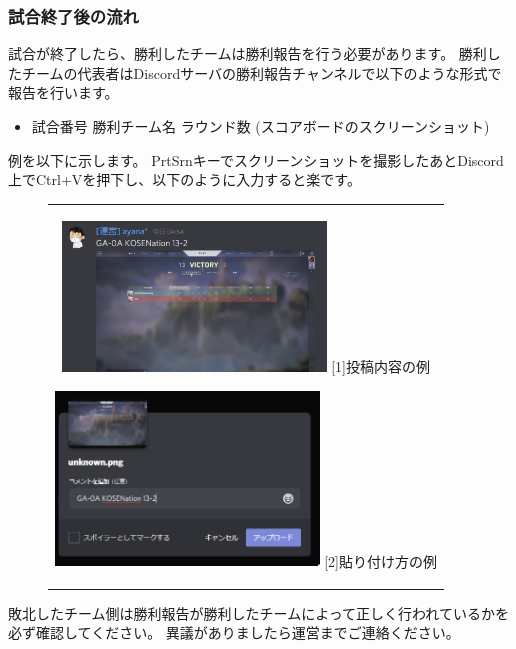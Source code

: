 \documentclass[uplatex,dvipdfmx]{jsarticle}
\begin{document}
	    \subsubsection{試合終了後の流れ}
	        試合が終了したら、勝利したチームは勝利報告を行う必要があります。
	        勝利したチームの代表者はDiscordサーバの勝利報告チャンネルで以下のような形式で報告を行います。
	        \begin{itemize}
	            \item 試合番号 勝利チーム名 ラウンド数 (スコアボードのスクリーンショット)
	        \end{itemize}
	        例を以下に示します。
	        PrtSrnキーでスクリーンショットを撮影したあとDiscord上でCtrl+Vを押下し、以下のように入力すると楽です。
	        \begin{figure}[H]
	            \begin{center}
	                \begin{tabular}{c}
	                    \begin{minipage}{0.5\hsize}
	                        \begin{center}
                                \includegraphics[width=70mm]{result.png}
	                            \hspace{1.6cm} [1]投稿内容の例
	                        \end{center}
	                    \end{minipage}

	                    \begin{minipage}{0.5\hsize}
	                        \begin{center}
                                \includegraphics[width=70mm]{example.png}
	                            \hspace{1.6cm} [2]貼り付け方の例
	                        \end{center}
	                    \end{minipage}
	                \end{tabular}
	            \end{center}
            \end{figure}
            敗北したチーム側は勝利報告が勝利したチームによって正しく行われているかを必ず確認してください。
            異議がありましたら運営までご連絡ください。
\end{document}
